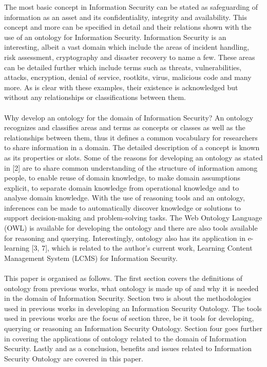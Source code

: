 \documentclass[conference, compsoc]{IEEEtran}
\begin{document}
The most basic concept in Information Security can be stated as  safeguarding of information as an asset and its confidentiality, integrity and availability. This concept and more can be specified in detail and their relations shown with the use of an ontology for Information Security. Information Security is an interesting, albeit a vast domain which include the areas of incident handling, risk assessment, cryptography and disaster recovery to name a few. These areas can be detailed further which include terms such as threats, vulnerabilities, attacks, encryption, denial of service, rootkits, virus, malicious code and many more. As is clear with these examples, their existence is acknowledged but without any relationships or classifications between them.
\\
\\
Why develop an ontology for the domain of Information Security? An ontology recognizes and classifies areas and terms as concepts or classes as well as the relationships between them, thus it defines a common vocabulary for researchers to share information in a domain. The detailed description of a concept is known as its properties or slots. Some of the reasons for developing an ontology as stated in [2] are to share common understanding of the structure of information among people, to enable reuse of domain knowledge, to make domain assumptions explicit, to separate domain knowledge from operational knowledge and to analyse domain knowledge. With the use of reasoning tools and an ontology, inferences can be made to automatically discover knowledge or solutions to support decision-making and problem-solving tasks. The Web Ontology Language (OWL) is available for developing the ontology and there are also tools available for reasoning and querying. Interestingly, ontology also has its application in e-learning [3, 7], which is related to the author's current work, Learning Content Management System (LCMS) for Information Security.
\\
\\
This paper is organised as follows. The first section covers the definitions of ontology from previous works, what ontology is made up of and why it is needed in the domain of Information Security. Section two is about the methodologies used in previous works in developing an Information Security Ontology. The tools used in previous works are the focus of section three, be it tools for developing, querying or reasoning an Information Security Ontology. Section four goes further in covering the applications of ontology related to the domain of Information Security. Lastly and as a conclusion, benefits and issues related to Information Security Ontology are covered in this paper.  
\end{document}
